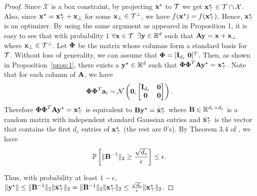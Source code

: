 \documentclass{article}
\begin{document}
\begin{proof}
Since $\mathcal{X}$ is a box constraint, by projecting $\mathbf{x}^\star$ to $\cal T$ we get $\mathbf{x}^\star_\top \in \mathcal{T} \cap \mathcal{X}$. Also, since $\mathbf{x}^\star =  \mathbf{x}^\star_\top + \mathbf{x}_\bot$ for some $\mathbf{x}_\bot \in \cal T^{\bot}$, we have $f(\mathbf{x}^\star) = f(\mathbf{x}^\star_\top)$. Hence, $\mathbf{x}^\star_\top$ is an optimizer.
By using the same argument as appeared in Proposition 1, it is easy to see that with probability $1$ $\forall \mathbf{x} \in \cal T$ $\exists \mathbf{y} \in \mathbb{R}^d$ such that $\mathbf{A}\mathbf{y} = \mathbf{x} + \mathbf{x}_\bot$ where $\mathbf{x}_\bot \in \cal T^{\bot}$. Let $\boldsymbol{\Phi}$ be the matrix whose columns form a standard basis for $\cal T$. Without loss of generality, we can assume that 
$\boldsymbol{\Phi} = [\mathbf{I}_{d_e} \; \mathbf{0} ]^T$.
Then, as shown in Proposition~\ref{prop:1}, there exists a $\mathbf{y}^\star \in \mathbb{R}^d$ such that $\boldsymbol{\Phi} \boldsymbol{\Phi}^{T}\mathbf{A} \mathbf{y}^\star = \mathbf{x}^\star_\top$. Note that for each column of $\mathbf{A}$, we have
\[ \boldsymbol{\Phi} \boldsymbol{\Phi}^{T}\mathbf{a}_i \sim \mathcal{N}\left(\mathbf{0}, \begin{bmatrix}
\mathbf{I}_{d_e} & {\bf 0}\\
{\bf 0} & {\bf 0}\end{bmatrix}\right). \]
Therefore $\boldsymbol{\Phi} \boldsymbol{\Phi}^{T}\mathbf{A}\mathbf{y}^\star = \mathbf{x}^\star_\top$ is equivalent to $\mathbf{B}\mathbf{y}^\star = \bar{\mathbf{x}}^\star_\top$ where $\mathbf{B}\in \mathbb{R}^{d_e \times d_e}$ is a random matrix with independent standard Gaussian entries and $\bar{\mathbf{x}}^\star_\top$ is the vector that contains the first $d_e$ entries of $\mathbf{x}^\star_\top$ (the rest are $0$'s). By Theorem 3.4 of \cite{Sankar:2003}, we have
\[ \mathbb{P}\left[\|\mathbf{B}^{-1}\|_2 \geq \frac{\sqrt{d_e}}{\epsilon}\right]  \leq \epsilon. \]

Thus, with probability at least $1-\epsilon$, $\|\mathbf{y}^\star\| \leq \|\mathbf{B}^{-1}\|_2  \|\bar{\mathbf{x}}^\star_\top\|_2 = \|\mathbf{B}^{-1}\|_2  \|\mathbf{x}^\star_\top\|_2 \leq \frac{\sqrt{d_e}}{\epsilon} \|\mathbf{x}^\star_\top\|_2$. 
\end{proof}
\end{document}
